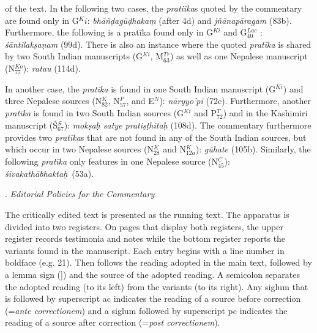 

\noindent
of the text. In the following two cases, the \textit{pratiīka}s quoted by the
commentary are found only in G$^Ki$: \textit{bhāñḍagūḍhakaṃ} (after 4d) and
\textit{jñānapāragam} (83b).
Furthermore, the following is a pratīka found
only in G$^{\scriptscriptstyle Ki}$ and G$^{\scriptscriptstyle Lac}_{\scriptscriptstyle 40}$ : \textit{śāntilakṣaṇam} (99d).
There is also an instance
where the quoted \textit{pratīka} is shared by two South Indian manuscripts
(G$^{\scriptscriptstyle Ki}$, M$^{\scriptscriptstyle Tr}_{\scriptscriptstyle 63}$)
as well as one Nepalese manuscript (N$^{\scriptscriptstyle Ko}_{\scriptscriptstyle 77}$): \textit{ratau} (114d).

In another case, the \textit{pratīka} is found in one South Indian manuscript
(G$^{\scriptscriptstyle Ki}$) and three Nepalese sources
(N$^{\scriptscriptstyle K}_{\scriptscriptstyle 82}$, N$^{\scriptscriptstyle P}_{\scriptscriptstyle 57}$, and E$^{\scriptscriptstyle N}$):
\textit{nāryyo'pi} (72c).
Furthermore, another \textit{pratīka} is found in two South Indian sources (G$^{\scriptscriptstyle Ki}$
and P$^{\scriptscriptstyle T}_{\scriptscriptstyle 72}$)
and in the Kashimiri manuscript (Ś$^{\scriptscriptstyle S}_{\scriptscriptstyle 67}$):
\textit{mokṣaḥ satye pratiṣṭhitaḥ} (108d). The commentary furthermore provides two
\textit{pratīka}s that are
not found in any of the South Indian sources, but which occur in two
Nepalese sources (N$^{\scriptscriptstyle K}_{\scriptscriptstyle 28}$
and N$^{\scriptscriptstyle K}_{\scriptscriptstyle 12a}$): \textit{gūhate} (105b).
Similarly, the following \textit{pratīka}
only features in one Nepalese source (N$^{\scriptscriptstyle C}_{\scriptscriptstyle 45}$):
\textit{śivakathābhaktaḥ}~(53a).

\vspace{1em}
. \textit{Editorial Policies for the Commentary}

\vspace{.3em}
\noindent
The critically edited text is presented as the running text. The apparatus
is divided into two registers. On pages that display both registers, the
upper register records testimonia and notes while the bottom register
reports the variants found in the manuscript. Each entry begins with a
line number in boldface (e.g. 21). Then follows the reading adopted
in the main text, followed by a lemma sign (]) and the source of the
adopted reading. A semicolon separates the adopted reading (to its
left) from the variants (to its right). Any siglum that is followed by
superscript ac indicates the reading of a source before correction
(=\textit{ante correctionem}) and a siglum followed by superscript pc indicates
the reading of a source after correction (=\textit{post correctionem}).

